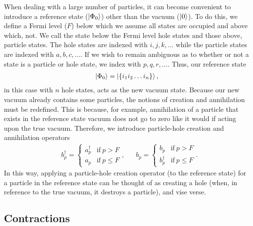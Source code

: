 \documentclass[10pt]{article}
\begin{document}
When dealing with a large number of particles, it can become convenient to introduce a reference state ($\ket{\Phi_0}$) other than the vacuum ($\ket{0}$). To do this, we define a Fermi level ($F$) below which we assume all states are occupied and above which, not. We call the state below the Fermi level hole states and those above, particle states. The hole states are indexed with $i,j,k,...$ while the particle states are indexed with $a,b,c,...$. If we wish to remain ambiguous as to whether or not a state is a particle or hole state, we index with $p,q,r,...$. Thus, our reference state
\begin{align}
\ket{\Phi_0}=\ket{\{i_1i_2\ldots i_n\}},
\end{align}
in this case with $n$ hole states, acts as the new vacuum state. Because our new vacuum already contains some particles, the notions of creation and annihilation must be redefined. This is because, for example, annihilation of a particle that exists in the reference state vacuum does not go to zero like it would if acting upon the true vacuum. Therefore, we introduce particle-hole creation and annihilation operators
\begin{align}
&
b^\dagger_p
=
\begin{cases}
a^\dagger_p & \text{if} \ p > F
\\
a_p & \text{if} \ p \leq F
\end{cases},
&&
b_p
=
\begin{cases}
b_p & \text{if} \ p > F
\\
b^\dagger_p & \text{if} \ p \leq F
\end{cases}.
\end{align}
In this way, applying a particle-hole creation operator (to the reference state) for a particle in the reference state can be thought of as creating a hole (when, in reference to the true vacuum, it destroys a particle), and vise verse.

\subsection{Contractions} 
\end{document}
